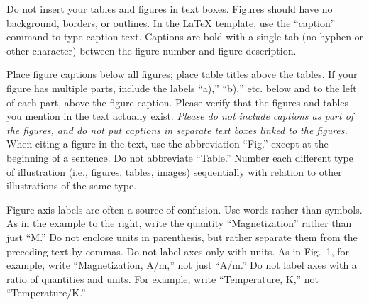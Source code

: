 \documentclass[conf]{new-aiaa}
\begin{document}
Do not insert your tables and figures in text boxes. Figures should have no background, borders, or outlines. In the \LaTeX{} template, use the ``caption'' command to type caption text. Captions are bold with a single tab (no hyphen or other character) between the figure number and figure description.




Place figure captions below all figures; place table titles above the tables. If your figure has multiple parts, include the labels ``a),'' ``b),'' etc. below and to the left of each part, above the figure caption. Please verify that the figures and tables you mention in the text actually exist. \emph{Please do not include captions as part of the figures, and do not put captions in separate text boxes linked to the figures.} When citing a figure in the text, use the abbreviation ``Fig.'' except at the beginning of a sentence. Do not abbreviate ``Table.'' Number each different type of illustration (i.e., figures, tables, images) sequentially with relation to other illustrations of the same type.

Figure axis labels are often a source of confusion. Use words rather than symbols. As in the example to the right, write the quantity ``Magnetization'' rather than just ``M.'' Do not enclose units in parenthesis, but rather separate them from the preceding text by commas. Do not label axes only with units. As in Fig.~1, for example, write ``Magnetization, \si[per-mode=symbol]{\ampere\per\meter},'' not just ``A/m.'' Do not label axes with a ratio of quantities and units. For example, write ``Temperature, K,'' not ``Temperature/K.''
\end{document}
